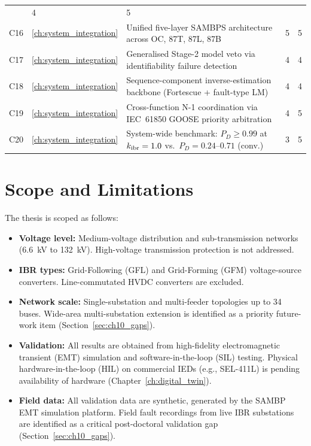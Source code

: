 \begin{table}[htbp]
\begin{tabularx}{\textwidth}{@{}clp{8.5cm}cc@{}}
  & 4 & 5 \\
C16 & \ref{ch:system_integration}
  & Unified five-layer SAMBPS architecture across OC, 87T, 87L, 87B
  & 5 & 5 \\
C17 & \ref{ch:system_integration}
  & Generalised Stage-2 model veto via identifiability failure detection
  & 4 & 4 \\
C18 & \ref{ch:system_integration}
  & Sequence-component inverse-estimation backbone (Fortescue + fault-type LM)
  & 4 & 4 \\
C19 & \ref{ch:system_integration}
  & Cross-function N-1 coordination via IEC~61850 GOOSE priority arbitration
  & 4 & 5 \\
C20 & \ref{ch:system_integration}
  & System-wide benchmark: $P_D\geq0.99$ at $k_{\rm ibr}=1.0$ vs.\ $P_D=0.24$--$0.71$ (conv.)
  & 3 & 5 \\
\bottomrule
\end{tabularx}
\end{table}

\section{Scope and Limitations}
\label{sec:ch1_scope}

The thesis is scoped as follows:

\begin{itemize}
\item \textbf{Voltage level:} Medium-voltage distribution and sub-transmission
      networks (6.6~kV to 132~kV). High-voltage transmission protection
      is not addressed.
\item \textbf{IBR types:} Grid-Following (GFL) and Grid-Forming (GFM)
      voltage-source converters. Line-commutated HVDC converters are excluded.
\item \textbf{Network scale:} Single-substation and multi-feeder topologies
      up to 34 buses. Wide-area multi-substation extension is identified
      as a priority future-work item (Section~\ref{sec:ch10_gaps}).
\item \textbf{Validation:} All results are obtained from high-fidelity
      electromagnetic transient (EMT) simulation and software-in-the-loop
      (SIL) testing. Physical hardware-in-the-loop (HIL) on commercial IEDs
      (e.g., SEL-411L) is pending availability of hardware (Chapter~\ref{ch:digital_twin}).
\item \textbf{Field data:} All validation data are synthetic, generated by
      the SAMBP EMT simulation platform. Field fault recordings from live IBR
      substations are identified as a critical post-doctoral validation gap
      (Section~\ref{sec:ch10_gaps}).
\end{itemize}

